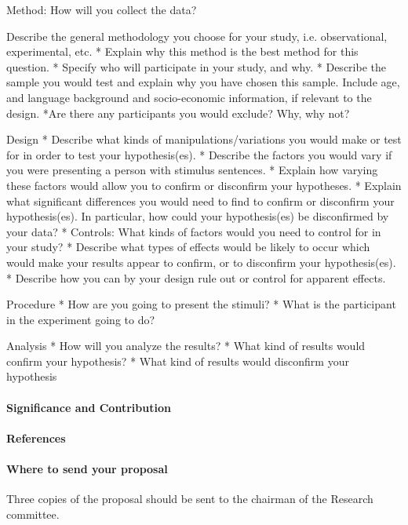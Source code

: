 Method: How will you collect the data?

Describe the general methodology you choose for your study, i.e. observational, experimental, etc.
* Explain why this method is the best method for this question.
* Specify who will participate in your study, and why.
* Describe the sample you would test and explain why you have chosen this sample. Include age, and language background and socio-economic information, if relevant to the design.
*Are there any participants you would exclude? Why, why not?

Design
* Describe what kinds of manipulations\slash variations you would make or test for in order to test your hypothesis(es).
* Describe the factors you would vary if you were presenting a person with stimulus sentences.
* Explain how varying these factors would allow you to confirm or disconfirm your hypotheses.
* Explain what significant differences you would need to find to confirm or disconfirm your hypothesis(es). In particular, how could your hypothesis(es) be disconfirmed by your data?
* Controls: What kinds of factors would you need to control for in your study?
* Describe what types of effects would be likely to occur which would make your results appear to confirm, or to disconfirm your hypothesis(es).
* Describe how you can by your design rule out or control for apparent effects.

Procedure
* How are you going to present the stimuli?
* What is the participant in the experiment going to do?

Analysis
* How will you analyze the results?
* What kind of results would confirm your hypothesis?
* What kind of results would disconfirm your hypothesis

\paragraph{Significance and Contribution}
\label{significanceandcontribution}

\paragraph{References}
\label{references}

\paragraph{Where to send your proposal}
\label{wheretosendyourproposal}

Three copies of the proposal should be sent to the chairman of the Research committee.

